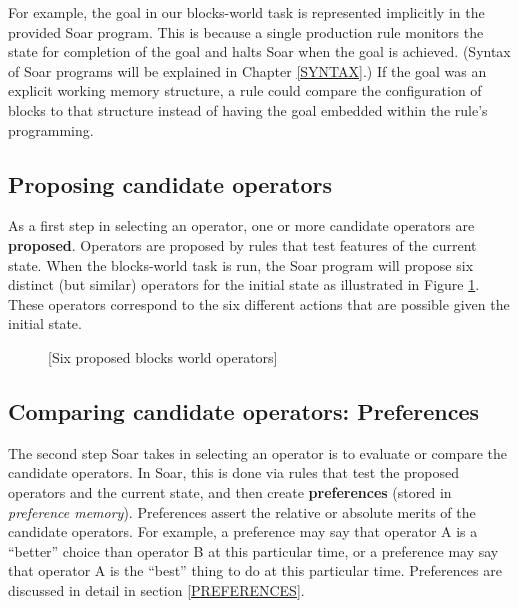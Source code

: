 For example, the goal in our blocks-world task is represented implicitly in the provided Soar program. This is because a single production rule monitors the state for completion of the goal and halts Soar when the goal is achieved. (Syntax of Soar programs will be explained in Chapter \ref{SYNTAX}.) If the goal was an explicit working memory structure, a rule could compare the configuration of blocks to that structure instead of having the goal embedded within the rule's programming.

\subsection{Proposing candidate operators}

As a first step in selecting an operator, one or more candidate operators are \textbf{proposed}.  Operators are proposed by rules that test features of the current state.  When the blocks-world task is run, the Soar program will propose six distinct (but similar) operators for the initial state as illustrated in Figure \ref{fig:proposal}. These operators correspond to the six different actions that are possible given the initial state.

\begin{figure}
	[Six proposed blocks world operators]
	\label{fig:proposal}
\end{figure}


\subsection{Comparing candidate operators: Preferences}

The second step Soar takes in selecting an operator is to evaluate or compare the candidate operators. In Soar, this is done via rules that test the proposed operators and the current state, and then create \textbf{preferences} (stored in \emph{preference memory}).  Preferences assert the relative or absolute merits of the candidate operators. For example, a preference may say that operator A is a ``better'' choice than operator B at this particular time, or a preference may say that operator A is the ``best'' thing to do at this particular time. Preferences are discussed in detail in section \ref{PREFERENCES}. 

